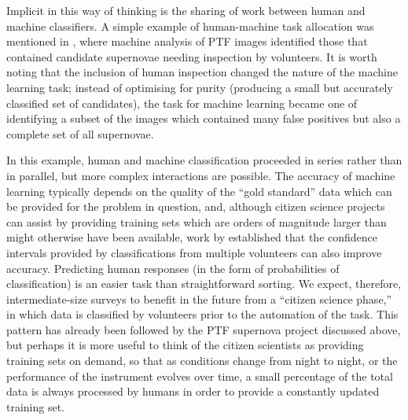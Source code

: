 \documentclass{ar2e}
\begin{document}
Implicit in this way of thinking is the sharing of work between human and
machine classifiers. 
A simple example of human-machine task allocation was mentioned in
, where machine analysis of PTF images identified those
that contained candidate supernovae needing inspection by volunteers. It is
worth noting that the inclusion of human inspection changed the nature of the
machine learning task; instead of optimising for purity (producing a small but
accurately classified set of candidates), the task for machine learning became
one of identifying a subset of the images which contained many false positives
but also a complete set of all supernovae. 

In this example, human and machine classification proceeded in series rather
than in parallel, but more complex interactions are possible. The accuracy of
machine learning typically depends on the quality of the ``gold standard''
data which can be provided for the problem in question, and, although citizen
science projects can assist by providing training sets which are orders of
magnitude larger than might otherwise have been available, work by
\citet{Banerji++2010} established that the confidence intervals provided by
classifications from multiple volunteers can also improve accuracy. Predicting
human responses (in the form of probabilities of classification) is an easier
task than straightforward sorting. We expect, therefore, intermediate-size
surveys to benefit in the future from a ``citizen science phase,'' in which
data is classified by volunteers prior to the automation of the task. This
pattern has already been followed by the PTF supernova project discussed
above, but perhaps it is more useful to think of the citizen scientists as
providing training sets on demand, so that as conditions change from night to
night, or the performance of the instrument evolves over time, a small
percentage of the total data is always processed by humans in order to provide
a constantly updated training set. 
\end{document}
